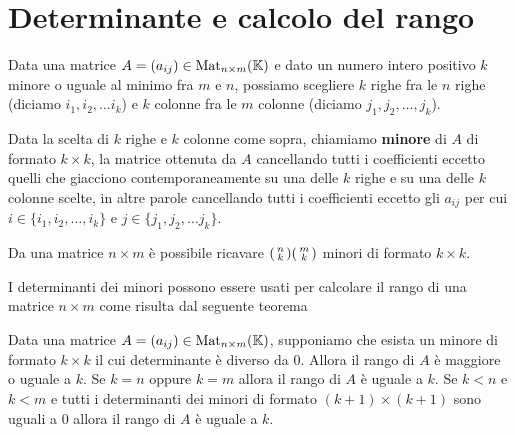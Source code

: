 \section{Determinante e calcolo del rango}
Data una matrice $A = (a_{ij}) \in \operatorname{Mat}_{n \times m}(\mathbb{K})$ e dato un
numero intero positivo $k$ minore o uguale al minimo fra $m$ e $n$, possiamo
scegliere $k$ righe fra le $n$ righe (diciamo $i_1, i_2, \dots i_k$) e
$k$ colonne fra le $m$ colonne (diciamo $j_1, j_2, \dots, j_k$).

\begin{definition}
	Data la scelta di $k$ righe e $k$ colonne come sopra, chiamiamo
	\textbf{minore} di $A$ di formato $k \times k$, la matrice ottenuta da $A$
	cancellando tutti i coefficienti eccetto quelli che giacciono
	contemporaneamente su una delle $k$ righe e su una delle $k$ colonne scelte,
	in altre parole cancellando tutti i coefficienti eccetto gli $a_{ij}$ per
	cui $i \in \{i_1, i_2, \dots, i_k\}$ e $j \in \{j_1, j_2, \dots j_k\}$.
\end{definition}

\begin{observation}
	Da una matrice $n \times m$ è possibile ricavare $\begin{psmallmatrix}
			n \\ k \end{psmallmatrix} \begin{psmallmatrix}
			m \\ k \end{psmallmatrix}$ minori di formato $k \times k$.
\end{observation}

I determinanti dei minori possono essere usati per calcolare il rango di una
matrice $n \times m$ come risulta dal seguente teorema

\begin{theorem}
	Data una matrice $A = (a_{ij}) \in \operatorname{Mat}_{n \times m}(\mathbb{K})$, supponiamo
	che esista un minore di formato $k \times k$ il cui determinante è diverso
	da 0. Allora il rango di $A$ è maggiore o uguale a $k$. Se $k = n$ oppure
	$k = m$ allora il rango di $A$ è uguale a $k$. Se $k < n$ e $k < m$ e tutti
	i determinanti dei minori di formato $(k + 1) \times (k + 1)$ sono uguali a 0
	allora il rango di $A$ è uguale a $k$.
\end{theorem}


